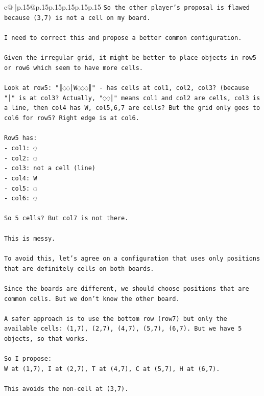 \documentclass{article}
\begin{document}
{\begin{supertabular}{c@{$\;$}|p{.15\linewidth}@{}p{.15\linewidth}p{.15\linewidth}p{.15\linewidth}p{.15\linewidth}p{.15\linewidth}}
{{{\texttt{So the other player's proposal is flawed because (3,7) is not a cell on my board.} \\
\\ 
\texttt{I need to correct this and propose a better common configuration.} \\
\\ 
\texttt{Given the irregular grid, it might be better to place objects in row5 or row6 which seem to have more cells.} \\
\\ 
\texttt{Look at row5: "║◌◌│W◌◌◌║" {-} has cells at col1, col2, col3? (because "│" is at col3? Actually, "◌◌│" means col1 and col2 are cells, col3 is a line, then col4 has W, col5,6,7 are cells? But the grid only goes to col6 for row5? Right edge is at col6.} \\
\\ 
\texttt{Row5 has:} \\
\texttt{{-} col1: ◌} \\
\texttt{{-} col2: ◌} \\
\texttt{{-} col3: not a cell (line)} \\
\texttt{{-} col4: W} \\
\texttt{{-} col5: ◌} \\
\texttt{{-} col6: ◌} \\
\\ 
\texttt{So 5 cells? But col7 is not there.} \\
\\ 
\texttt{This is messy.} \\
\\ 
\texttt{To avoid this, let's agree on a configuration that uses only positions that are definitely cells on both boards.} \\
\\ 
\texttt{Since the boards are different, we should choose positions that are common cells. But we don't know the other board.} \\
\\ 
\texttt{A safer approach is to use the bottom row (row7) but only the available cells: (1,7), (2,7), (4,7), (5,7), (6,7). But we have 5 objects, so that works.} \\
\\ 
\texttt{So I propose: } \\
\texttt{W at (1,7), I at (2,7), T at (4,7), C at (5,7), H at (6,7).} \\
\\ 
\texttt{This avoids the non{-}cell at (3,7).} \\
}}}
\end{supertabular}}
\end{document}
